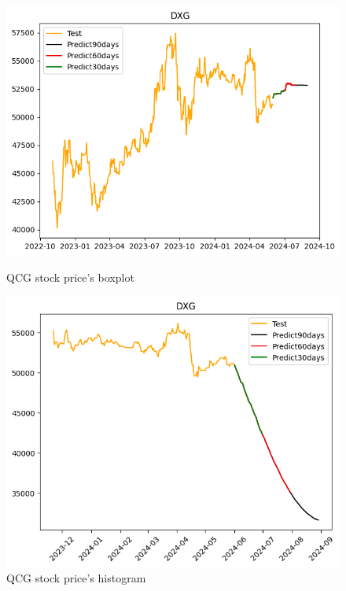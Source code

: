 \documentclass{ieeeojies}
\begin{document}
\begin{figure}[H]
  \centering
  \begin{minipage}{0.23\textwidth}
  \centering
  \includegraphics[width=1\textwidth]{bibliography/Figure/RF_7-3.png}
  \caption{QCG stock price's boxplot}
  \label{fig:1}
  \end{minipage}
  \hfill
  \begin{minipage}{0.23\textwidth}
  \centering
  \includegraphics[width=1\textwidth]{bibliography/Figure/RNN_9-1.png}
  \caption{QCG stock price's histogram}
  \label{fig:2}
  \end{minipage}
\end{figure}
\end{document}
